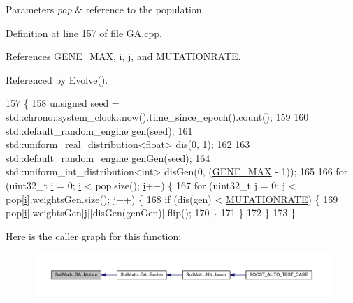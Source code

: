 \begin{DoxyParams}{Parameters}
{\em pop} & reference to the population \\
\hline
\end{DoxyParams}


Definition at line 157 of file G\+A.\+cpp.



References G\+E\+N\+E\+\_\+\+M\+A\+X, i, j, and M\+U\+T\+A\+T\+I\+O\+N\+R\+A\+T\+E.



Referenced by Evolve().


\begin{DoxyCode}
157                                  \{
158   \textcolor{keywordtype}{unsigned} seed = std::chrono::system\_clock::now().time\_since\_epoch().count();
159 
160   std::default\_random\_engine gen(seed);
161   std::uniform\_real\_distribution<float> dis(0, 1);
162 
163   std::default\_random\_engine genGen(seed);
164   std::uniform\_int\_distribution<int> disGen(0, (\hyperlink{_soil_math_types_8h_aa5e1eb1a998e5ed69af2076cf318df4b}{GENE\_MAX} - 1));
165 
166   \textcolor{keywordflow}{for} (uint32\_t \hyperlink{_comparision_pictures_2_createtest_image_8m_a6f6ccfcf58b31cb6412107d9d5281426}{i} = 0; \hyperlink{_comparision_pictures_2_createtest_image_8m_a6f6ccfcf58b31cb6412107d9d5281426}{i} < pop.size(); \hyperlink{_comparision_pictures_2_createtest_image_8m_a6f6ccfcf58b31cb6412107d9d5281426}{i}++) \{
167     \textcolor{keywordflow}{for} (uint32\_t \hyperlink{_comparision_pictures_2_createtest_image_8m_ac86694252f8dfdb19aaeadc4b7c342c6}{j} = 0; \hyperlink{_comparision_pictures_2_createtest_image_8m_ac86694252f8dfdb19aaeadc4b7c342c6}{j} < pop[\hyperlink{_comparision_pictures_2_createtest_image_8m_a6f6ccfcf58b31cb6412107d9d5281426}{i}].weightsGen.size(); \hyperlink{_comparision_pictures_2_createtest_image_8m_ac86694252f8dfdb19aaeadc4b7c342c6}{j}++) \{
168       \textcolor{keywordflow}{if} (dis(gen) < \hyperlink{_soil_math_types_8h_a609754629b7669df73d7e8edda337162}{MUTATIONRATE}) \{
169         pop[\hyperlink{_comparision_pictures_2_createtest_image_8m_a6f6ccfcf58b31cb6412107d9d5281426}{i}].weightsGen[\hyperlink{_comparision_pictures_2_createtest_image_8m_ac86694252f8dfdb19aaeadc4b7c342c6}{j}][disGen(genGen)].flip();
170       \}
171     \}
172   \}
173 \}
\end{DoxyCode}


Here is the caller graph for this function\+:
\nopagebreak
\begin{figure}[H]
\begin{center}
\leavevmode
\includegraphics[width=350pt]{class_soil_math_1_1_g_a_a489f2afd54086c14f45b654aeec0fe3c_icgraph}
\end{center}
\end{figure}


